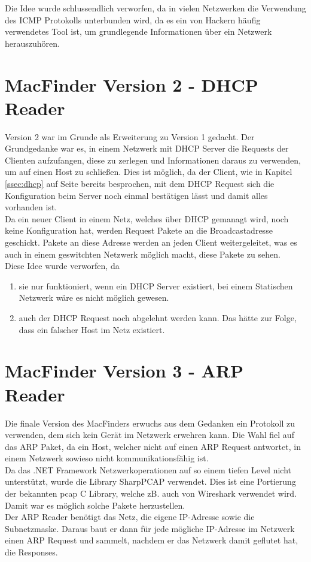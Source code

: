 \documentclass[12pt,a4paper]{report}
\begin{document}
\begin{onehalfspace}
Die Idee wurde schlussendlich verworfen, da in vielen Netzwerken die Verwendung des ICMP Protokolls unterbunden wird, da es ein von Hackern häufig verwendetes Tool ist, um grundlegende Informationen über ein Netzwerk herauszuhören.

\section{MacFinder Version 2 - DHCP Reader}
Version 2 war im Grunde als Erweiterung zu Version 1 gedacht. Der Grundgedanke war es, in einem Netzwerk mit DHCP Server die Requests der Clienten aufzufangen, diese zu zerlegen und Informationen daraus zu verwenden, um auf einen Host zu schließen. Dies ist möglich, da der Client, wie in Kapitel \ref{ssec:dhcp} auf Seite \pageref{ssec:dhcp} bereits besprochen, mit dem DHCP Request sich die Konfiguration beim Server noch einmal bestätigen lässt und damit alles vorhanden ist.\\
Da ein neuer Client in einem Netz, welches über DHCP gemanagt wird, noch keine Konfiguration hat, werden Request Pakete an die Broadcastadresse geschickt. Pakete an diese Adresse werden an jeden Client weitergeleitet, was es auch in einem geswitchten Netzwerk möglich macht, diese Pakete zu sehen.\\

Diese Idee wurde verworfen, da
\begin{enumerate}
\item sie nur funktioniert, wenn ein DHCP Server existiert, bei einem Statischen Netzwerk wäre es nicht möglich gewesen.
\item auch der DHCP Request noch abgelehnt werden kann. Das hätte zur Folge, dass ein falscher Host im Netz existiert.
\end{enumerate}

\section{MacFinder Version 3 - ARP Reader}
Die finale Version des MacFinders erwuchs aus dem Gedanken ein Protokoll zu verwenden, dem sich kein Gerät im Netzwerk erwehren kann. Die Wahl fiel auf das ARP Paket, da ein Host, welcher nicht auf einen ARP Request antwortet, in einem Netzwerk sowieso nicht kommunikationsfähig ist.\\
Da das .NET Framework Netzwerkoperationen auf so einem tiefen Level nicht unterstützt, wurde die Library SharpPCAP verwendet. Dies ist eine Portierung der bekannten pcap C Library, welche zB. auch von Wireshark verwendet wird. Damit war es möglich solche Pakete herzustellen.\\
Der ARP Reader benötigt das Netz, die eigene IP-Adresse sowie die Subnetzmaske. Daraus baut er dann für jede mögliche IP-Adresse im Netzwerk einen ARP Request und sammelt, nachdem er das Netzwerk damit geflutet hat, die Responses.\\


\end{onehalfspace}
\end{document}
